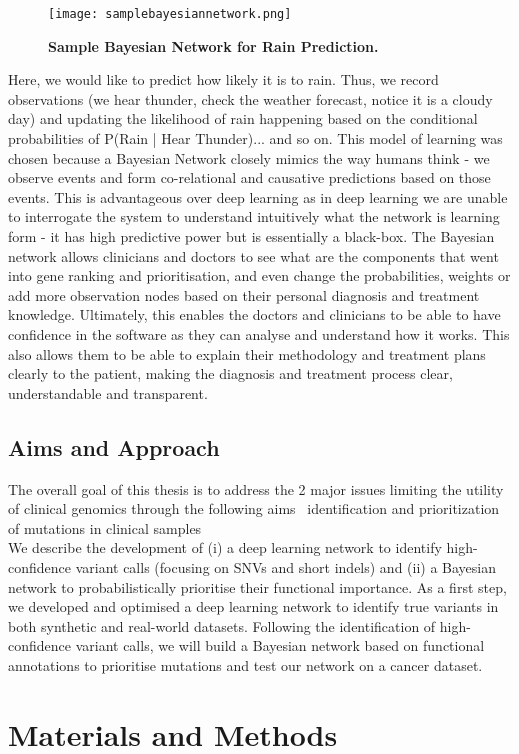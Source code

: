 \documentclass{article}
\begin{document}
\begin{figure}[H]
\centering
\texttt{[image: samplebayesiannetwork.png]}
\caption{\textbf{Sample Bayesian Network for Rain Prediction.}}
\end{figure}
Here, we would like to predict how likely it is to rain. Thus, we record observations (we hear thunder, check the weather forecast, notice it is a cloudy day) and updating the likelihood of rain happening based on the conditional probabilities of P(Rain | Hear Thunder)... and so on. This model of learning was chosen because a Bayesian Network closely mimics the way humans think - we observe events and form co-relational and causative predictions based on those events. This is advantageous over deep learning as in deep learning we are unable to interrogate the system to understand intuitively what the network is learning form - it has high predictive power but is essentially a black-box. The Bayesian network allows clinicians and doctors to see what are the components that went into gene ranking and prioritisation, and even change the probabilities, weights or add more observation nodes based on their personal diagnosis and treatment knowledge. Ultimately, this enables the doctors and clinicians to be able to have confidence in the software as they can analyse and understand how it works. This also allows them to be able to explain their methodology and treatment plans clearly to the patient, making the diagnosis and treatment process clear, understandable and transparent.
\subsection{Aims and Approach}
The overall goal of this thesis is to address the 2 major issues limiting the utility of clinical genomics through the following aims \: \ identification and prioritization of mutations in clinical samples \\ We describe the development of (i) a deep learning network to identify high-confidence variant calls (focusing on SNVs and short indels) and (ii) a Bayesian network to probabilistically prioritise their functional importance. As a first step, we developed and optimised a deep learning network to identify true variants in both synthetic and real-world datasets. Following the identification of high-confidence variant calls, we will build a Bayesian network based on functional annotations to prioritise mutations and test our network on a cancer dataset.
\newpage
\section{Materials and Methods}
\end{document}
